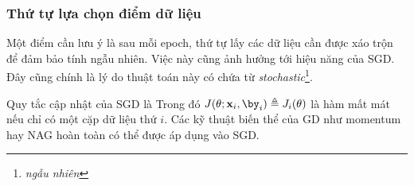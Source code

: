 \subsubsection{Thứ tự lựa chọn điểm dữ liệu}

Một điểm cần lưu ý là sau mỗi epoch, thứ tự lấy các dữ liệu cần được xáo trộn để đảm bảo tính ngẫu nhiên.
Việc này cũng ảnh hưởng tới hiệu năng của SGD. Đây cũng chính là lý do thuật
toán này có chứa từ \textit{stochastic}\footnote{\textit{ngẫu nhiên}}.

Quy tắc cập nhật của SGD là
Trong đó $J(\theta; \mathbf{x}_i, \by_i) \triangleq J_i(\theta)$ là hàm
mất mát nếu chỉ có một cặp dữ liệu thứ $i$. Các kỹ thuật biến
thể của GD như momentum hay NAG hoàn toàn có thể được áp dụng vào SGD.










